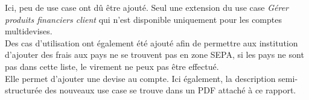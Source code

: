 Ici, peu de use case ont dû être ajouté. Seul une extension du use case \textit{Gérer produits financiers client} qui n'est disponible uniquement pour les comptes multidevises.\\
Des cas d'utilisation ont également été ajouté afin de permettre aux institution d'ajouter des frais aux pays ne se trouvent pas en zone SEPA, si les pays ne sont pas dans cette liste, le virement ne peux pas être effectué.\\
Elle permet d'ajouter une devise au compte. Ici également, la description semi-structurée des nouveaux use case se trouve dans un PDF attaché à ce rapport.
